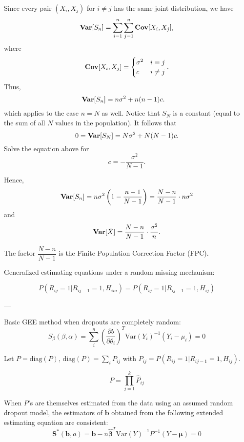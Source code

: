 \documentclass[UTF8,a4paper,10pt]{article}
\begin{document}
Since every pair $(X_i, X_j)$ for $i \neq j$ has the same joint distribution, we have
\begin{align*}
    \operatorname{\textbf{Var}}[S_n] = \sum_{i=1}^{n}\sum_{j=1}^{n}\operatorname{\textbf{Cov}}[X_i,X_j],
\end{align*}
where 
\[\operatorname{\textbf{Cov}}[X_i,X_j] = \begin{cases}
     \sigma^2 & i=j\\
    c  & i\neq j\\
\end{cases}.\]
Thus,
\begin{align*}
    \operatorname{\textbf{Var}}[S_n] 
    &= n\sigma^2 + n(n-1)c.\label{eq.01}
\end{align*}
which applies to the case $n=N$ as well. Notice that $S_N$ is a constant (equal to the sum of all $N$ values in the population). It follows that
\[
0 = \operatorname{\textbf{Var}}[S_N] = N\sigma^2 + N(N-1)c.
\]
Solve the equation above for $$c = -\frac{\sigma^2}{N-1}.$$

Hence,
\[
\operatorname{\textbf{Var}}[S_n] = n\sigma^2\left(1 - \frac{n-1}{N-1}\right) = \frac{N-n}{N-1} \cdot n\sigma^2
\]
and
\[
\operatorname{\textbf{Var}}[\bar{X}] = \frac{N-n}{N-1} \cdot \frac{\sigma^2}{n}.
\]

The factor \(\dfrac{N-n}{N-1}\) is the Finite Population Correction Factor (FPC).

\pagebreak

\begin{Problem}[]{Generalized estimating equations under a random missing mechanism:}

\[
P(R_{ij}=1|R_{ij-1}=1, H_{im}) = P(R_{ij}=1|R_{ij-1}=1, H_{ij})
\]

---

Basic GEE method when dropouts are completely random:
\[
S_{\beta}(\beta,\alpha) = \sum_{i}^n \left(\frac{\partial b}{\partial \theta_i}\right)^T \text{Var}(Y_i)^{-1}(Y_i - \mu_i) = 0
\]


Let $P=\text{diag}(P)$, $\text{diag}(P)=\sum_{i} P_{ij}$ with $P_{ij}=P(R_{ij}=1|R_{ij-1}=1,H_{ij})$.

\[
P = \prod_{j=1}^{k} \hat{P}_{ij}
\]

When $P$'s are themselves estimated from the data using an assumed random dropout model, the estimators of $\mathbf{b}$ obtained from the following extended estimating equation are consistent:
\[
\mathbf{S}^*(\mathbf{b},a) = \mathbf{b} - n \boldsymbol{\hat{\beta}}^T \text{Var}(Y)^{-1} P^{-1}(Y - \boldsymbol{\mu}) = 0
\]

\end{Problem}

\begin{Problem}[]{}
\end{Problem}
\end{document}
